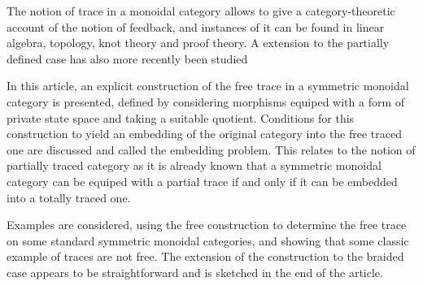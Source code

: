 The notion of trace in a monoidal category allows
to give a category-theoretic account of the notion of feedback, and instances of
it can be found in linear algebra, topology, knot theory and proof theory. A extension to the 
partially defined case has also more recently been studied

In this article, an explicit construction of the free trace in a symmetric monoidal category is presented,
defined by considering morphisms equiped with a form of private state space and taking a 
suitable quotient.
Conditions for this construction to yield an embedding of the original category into the free traced
one are discussed and called the embedding problem. 
This relates to the notion of partially traced category as it is already known that a symmetric
monoidal category can be equiped with a partial trace if and only if it can be embedded into a
totally traced one.

Examples are considered, using the free construction to determine the free trace on
some standard symmetric monoidal categories, and showing that some classic example of traces are not free.
The extension of the construction to the braided case appears to be straightforward and is sketched in
the end of the article.
